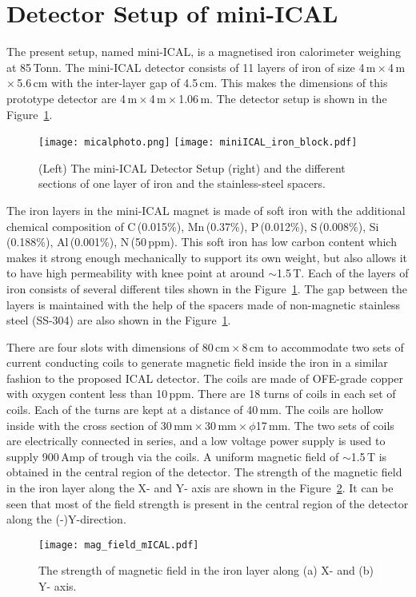 \section{Detector Setup of mini-ICAL}
The present setup, named mini-ICAL, is a magnetised iron calorimeter
weighing at 85\,Tonn. The mini-ICAL detector consists of 11 layers
of iron of size 4\,m\,$\times$\,4\,m\,$\times$\,5.6\,cm with the
inter-layer gap of 4.5\,cm. This makes the dimensions of this
prototype detector are 4\,m\,$\times$\,4\,m\,$\times$\,1.06\,m.
The detector setup is shown in the Figure~\ref{fig:miniICAL_iron}.
\begin{figure}[h]
  \centering
  \texttt{[image: micalphoto.png]}
  \texttt{[image: miniICAL\_iron\_block.pdf]}
  \caption{(Left) The mini-ICAL Detector Setup (right) and the
    different sections of one layer of iron and the stainless-steel
    spacers.}
  \label{fig:miniICAL_iron}
\end{figure}
The iron layers in the mini-ICAL magnet is made of soft iron with
the additional chemical composition of C\,(0.015\%), Mn\,(0.37\%),
P\,(0.012\%), S\,(0.008\%), Si\,(0.188\%), Al\,(0.001\%), N\,(50\,ppm).
This soft iron has low carbon content which makes it strong enough
mechanically to support its own weight, but also allows it to have high
permeability with knee point at around $\sim$1.5\,T.
Each of the layers of iron consists of several different tiles shown
in the Figure~\ref{fig:miniICAL_iron}.
The gap between the layers is maintained with the help of the spacers
made of non-magnetic stainless steel (SS-304) are also shown in the
Figure~\ref{fig:miniICAL_iron}.

There are four slots with dimensions of 80\,cm\,$\times$\,8\,cm to
accommodate two sets of current conducting coils to generate magnetic
field inside the iron in a similar fashion to the proposed
ICAL detector. The coils are made of OFE-grade copper with
oxygen content less than 10\,ppm. There are 18 turns of coils in each
set of coils. Each of the turns are kept at a distance of 40\,mm.
The coils are hollow inside with the cross section of
30\,mm\,$\times$\,30\,mm\,$\times$\,$\phi$17\,mm.
The two sets of coils are electrically connected in series,
and a low voltage power supply is used to supply 900\,Amp
of trough via the coils. A uniform magnetic field of $\sim$1.5\,T
is obtained in the central region of the detector.
The strength of the magnetic field in the iron layer along the X- and Y-
axis are shown in the Figure~\ref{fig:magfieldmical}. It can be seen
that most of the field strength is present in the central region of the
detector along the (-)Y-direction.
\begin{figure}[h]
  \centering
  \texttt{[image: mag\_field\_mICAL.pdf]}
  \caption{The strength of magnetic field in the iron layer along (a) X-
    and (b) Y- axis.}
  \label{fig:magfieldmical}
\end{figure}

